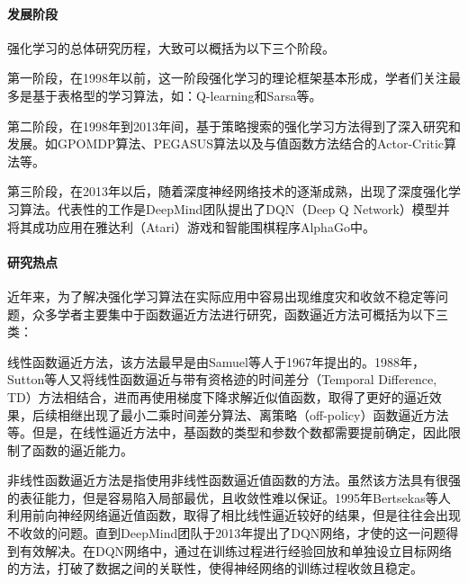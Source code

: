 \paragraph{发展阶段}
强化学习的总体研究历程，大致可以概括为以下三个阶段。

第一阶段，在1998年以前，这一阶段强化学习的理论框架基本形成，学者们关注最多是基于表格型的学习算法，如：Q-learning\citep{watkins1992q}和Sarsa\citep{rummery1994line}等。

第二阶段，在1998年到2013年间，基于策略搜索的强化学习方法得到了深入研究和发展。如GPOMDP算法\citep{baxter2001infinite}、PEGASUS算法\citep{neumann2005reinforcement}以及与值函数方法结合的Actor-Critic算法\citep{konda2000actor}等。

第三阶段，在2013年以后，随着深度神经网络技术的逐渐成熟，出现了深度强化学习算法。代表性的工作是DeepMind团队提出了DQN（Deep Q Network）模型并将其成功应用在雅达利（Atari）游戏和智能围棋程序AlphaGo中\citep{mnih2013playing,mnih2015human}。
\paragraph{研究热点}

近年来，为了解决强化学习算法在实际应用中容易出现维度灾和收敛不稳定等问题，众多学者主要集中于函数逼近方法进行研究，函数逼近方法可概括为以下三类：

线性函数逼近方法，该方法最早是由Samuel等人于1967年提出的\citep{samuel1959some}。1988年，Sutton等人又将线性函数逼近与带有资格迹的时间差分（Temporal Difference, TD）方法相结合，进而再使用梯度下降求解近似值函数\citep{sutton1988learning}，取得了更好的逼近效果，后续相继出现了最小二乘时间差分算法\citep{bradtke1996linear}、离策略（off-policy）函数逼近方法\citep{precup2001off}等。但是，在线性逼近方法中，基函数的类型和参数个数都需要提前确定，因此限制了函数的逼近能力。


非线性函数逼近方法是指使用非线性函数逼近值函数的方法。虽然该方法具有很强的表征能力，但是容易陷入局部最优，且收敛性难以保证。1995年Bertsekas等人利用前向神经网络逼近值函数，取得了相比线性逼近较好的结果，但是往往会出现不收敛的问题\citep{bertsekas1995neuro}。直到DeepMind团队于2013年提出了DQN网络，才使的这一问题得到有效解决。在DQN网络中，通过在训练过程进行经验回放\citep{mnih2013playing}和单独设立目标网络\citep{mnih2015human}的方法，打破了数据之间的关联性，使得神经网络的训练过程收敛且稳定。

